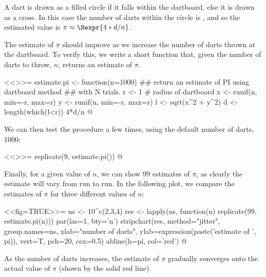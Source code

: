\documentclass[12pt]{article}
\begin{document}
A dart is drawn as a filled circle if it falls within the dartboard,
else it is drawn as a cross.  In this case the number of darts within
the circle is , and so the estimated value is $\pi \approx
\Sexpr{4*d/n}$.


The estimate of $\pi$ should improve as we increase the number of darts
thrown at the dartboard.  To verify this, we write a short function
that, given the number of darts to throw, $n$, returns an estimate of
$\pi$.  

<<>>=
estimate.pi <- function(n=1000) {
  ## return an estimate of PI using dartboard method
  ## with N trials.
  r <- 1                                # radius of dartboard
  x <- runif(n, min=-r, max=r)
  y <- runif(n, min=-r, max=r)
  l <- sqrt(x^2 + y^2)
  d <- length(which(l<r))
  4*d/n
}
@ 

We can then test the procedure a few times, using the default number
of darts, 1000:

<<>>=
replicate(9, estimate.pi())
@ 

Finally, for a given value of $n$, we can show 99 estimates of $\pi$,
as clearly the estimate will vary from run to run.  In the following
plot, we compare the estimates of $\pi$ for three different values of $n$:

\begin{center}
<<fig=TRUE>>=
ns <- 10^c(2,3,4)
res <- lapply(ns, function(n) replicate(99, estimate.pi(n)))
par(las=1, bty='n')
stripchart(res, method="jitter", group.names=ns, 
           xlab="number of darts",
           ylab=expression(paste('estimate of ', pi)),
           vert=T, pch=20, cex=0.5)
abline(h=pi, col='red')
@ 
\end{center}

As the number of darts increases, the estimate of $\pi$ gradually
converges onto the actual value of $\pi$ (shown by the solid red line).
\end{document}
